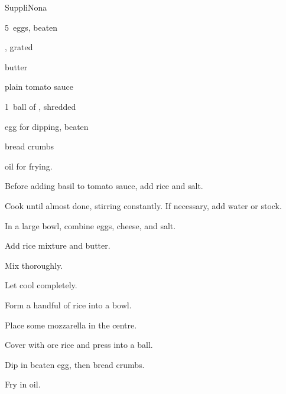 \begin{recipe}{Suppli}{Nona}{}

\begin{ingredients}
\item {} 
\item 5~eggs, beaten
\item {}, grated
\item \C{\quarter} butter
\item plain tomato sauce
\item 1~ball of , shredded
\item egg for dipping, beaten
\item bread crumbs
\item oil for frying.
\end{ingredients}

\begin{directions}
\item Before adding basil to tomato sauce, add rice and salt.
\item Cook until almost done, stirring constantly. If necessary, add water or stock. 
\item In a large bowl, combine eggs, cheese, and salt.
\item Add rice mixture and butter.
\item Mix thoroughly.
\item Let cool completely.
\item Form a handful of rice into a bowl.
\item Place some mozzarella in the centre.
\item Cover with ore rice and press into a ball.
\item Dip in beaten egg, then bread crumbs.
\item Fry in oil.
\end{directions}

\end{recipe}
